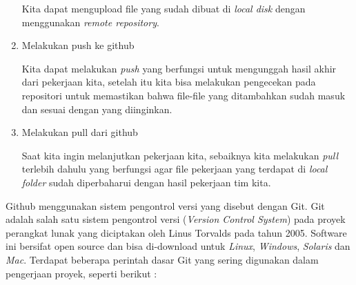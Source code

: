 \begin{enumerate}
    Kita dapat mengupload file yang sudah dibuat di \textit{local disk} dengan menggunakan \textit{remote repository}.
    \item Melakukan push ke github
    
    Kita dapat melakukan \textit{push} yang berfungsi untuk mengunggah hasil akhir dari pekerjaan kita, setelah itu kita bisa melakukan pengecekan pada repositori untuk memastikan bahwa file-file yang ditambahkan sudah masuk dan sesuai dengan yang diinginkan.
    \item Melakukan pull dari github
    
    Saat kita ingin melanjutkan pekerjaan kita, sebaiknya kita melakukan \textit{pull} terlebih dahulu yang berfungsi agar file pekerjaan yang terdapat di \textit{local folder} sudah diperbaharui dengan hasil pekerjaan tim kita.
\end{enumerate}

Github menggunakan sistem pengontrol versi yang disebut dengan Git. Git adalah salah satu sistem pengontrol versi (\textit{Version Control System}) pada proyek perangkat lunak yang diciptakan oleh Linus Torvalds pada tahun 2005. Software ini bersifat open source dan bisa di-download untuk \textit{Linux}, \textit{Windows}, \textit{Solaris} dan \textit{Mac}. Terdapat beberapa perintah dasar Git yang sering digunakan dalam pengerjaan proyek, seperti berikut :

